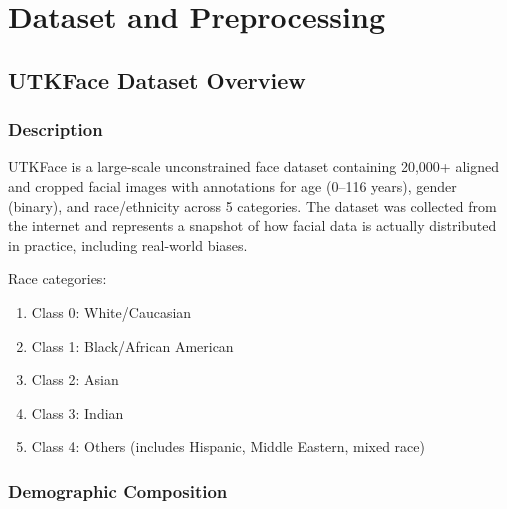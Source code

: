 \documentclass[11pt,a4paper,oneside]{report}
\begin{document}
\chapter{Dataset and Preprocessing}

\section{UTKFace Dataset Overview}

\subsection{Description}

UTKFace is a large-scale unconstrained face dataset containing 20,000+ aligned and cropped facial images with annotations for age (0--116 years), gender (binary), and race/ethnicity across 5 categories. The dataset was collected from the internet and represents a snapshot of how facial data is actually distributed in practice, including real-world biases.

Race categories:
\begin{enumerate}
\item Class 0: White/Caucasian
\item Class 1: Black/African American
\item Class 2: Asian
\item Class 3: Indian
\item Class 4: Others (includes Hispanic, Middle Eastern, mixed race)
\end{enumerate}

\subsection{Demographic Composition}
\end{document}
